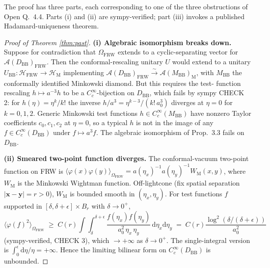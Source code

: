 \documentclass[11pt]{article}
\theoremstyle{definition}
\newcommand{\HH}{\mathcal{H}}
\renewcommand{\AA}{\mathcal{A}}
\newcommand{\BB}{\mathrm{BB}}
\newcommand{\FRW}{\mathrm{FRW}}
\newcommand{\Mink}{\mathrm{M}}
\begin{document}
The proof has three parts, each corresponding to one of the three
obstructions of Open Q.~4.4. Parts (i) and (ii) are sympy-verified;
part (iii) invokes a published Hadamard-uniqueness theorem.

\begin{proof}[Proof of Theorem \ref{thm:past}]
\textbf{(i) Algebraic isomorphism breaks down.} Suppose for contradiction
that $\Omega_\FRW$ extends to a cyclic-separating vector for
$\AA(D_\BB)_\FRW$. Then the conformal-rescaling unitary $U$ would extend
to a unitary $U_\BB:\HH_\FRW\to\HH_\Mink$ implementing
$\AA(D_\BB)_\FRW\xrightarrow{\sim}\AA(M_\BB)_\Mink$, with $M_\BB$ the
conformally identified Minkowski diamond. But this requires the test-
function rescaling $h\mapsto a^{-3}h$ to be a $C_c^\infty$-bijection on
$D_\BB$, which fails by sympy CHECK 2: for $h(\eta)=\eta^k/k!$ the inverse
$h/a^3=\eta^{k-3}/(k!\,a_0^3)$ diverges at $\eta=0$ for $k=0,1,2$.
Generic Minkowski test functions $h\in C_c^\infty(M_\BB)$ have nonzero
Taylor coefficients $c_0,c_1,c_2$ at $\eta=0$, so a typical $h$ is not in
the image of any $f\in C_c^\infty(D_\BB)$ under $f\mapsto a^3 f$. The
algebraic isomorphism of Prop.~3.3 fails on $D_\BB$.

\textbf{(ii) Smeared two-point function diverges.} The conformal-vacuum
two-point function on FRW is
$\langle\varphi(x)\varphi(y)\rangle_{\Omega_\FRW}=
a(\eta_x)^{-1}a(\eta_y)^{-1}W_\Mink(x,y)$, where $W_\Mink$ is the
Minkowski Wightman function. Off-lightcone (fix spatial separation
$|\mathbf{x}-\mathbf{y}|=r>0$), $W_\Mink$ is bounded smooth in
$(\eta_x,\eta_y)$. For test functions $f$ supported in
$[\delta,\delta+\epsilon]\times B_r$ with $\delta\to 0^+$,
\begin{equation*}
\langle\varphi(f)^2\rangle_{\Omega_\FRW}
\;\ge\; C(r) \int\!\!\int_{\delta}^{\delta+\epsilon}
\frac{f(\eta_x)f(\eta_y)}{a_0^2\,\eta_x\,\eta_y}\,
\mathrm{d}\eta_x\mathrm{d}\eta_y \;=\; C(r) \frac{\log^2(\delta/(\delta+\epsilon))}{a_0^2}
\end{equation*}
(sympy-verified, CHECK 3), which $\to+\infty$ as $\delta\to 0^+$. The
single-integral version is $\int_0^\epsilon\mathrm{d}\eta/\eta=+\infty$.
Hence the limiting bilinear form on $C_c^\infty(D_\BB)$ is unbounded.


\end{proof}
\end{document}
